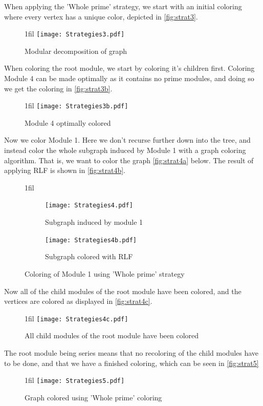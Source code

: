 \documentclass[a4paper]{article}
\makeatletter
\newcommand*{\centerfloat}{%
  \parindent \z@
  \leftskip \z@ \@plus 1fil \@minus \textwidth
  \rightskip\leftskip
  \parfillskip \z@skip}
\makeatother
\begin{document}
When applying the 'Whole prime' strategy, we start with an initial coloring 
where every vertex has a unique color, depicted in \autoref{fig:strat3}.

\begin{figure}[H]
    \centerfloat
    \texttt{[image: Strategies3.pdf]}
    \caption{Modular decomposition of graph}
    \label{fig:strat3}
\end{figure}

When coloring the root module, we start by coloring it's children first.
Coloring Module 4 can be made optimally as it contains no prime modules, and
doing so we get the coloring in \autoref{fig:strat3b}.

\begin{figure}[H]
    \centerfloat
    \texttt{[image: Strategies3b.pdf]}
    \caption{Module 4 optimally colored}
    \label{fig:strat3b}
\end{figure}

Now we color Module 1. Here we don't recurse further down into the tree, and
instead color the whole subgraph induced by Module 1 with a graph coloring
algorithm. That is, we want to color the graph \autoref{fig:strat4a} below.
The result of applying RLF is shown in \autoref{fig:strat4b}.

\begin{figure}[H]
\centerfloat
    \begin{subfigure}{.4\textwidth}
        \texttt{[image: Strategies4.pdf]}
      \caption{Subgraph induced by module 1}
      \label{fig:strat4a}
    \end{subfigure}%
    \begin{subfigure}{.4\textwidth}
        \texttt{[image: Strategies4b.pdf]}
      \caption{Subgraph colored with RLF}
      \label{fig:strat4b}
    \end{subfigure}
\caption{Coloring of Module 1 using 'Whole prime' strategy}
\label{fig:strat4}
\end{figure}

Now all of the child modules of the root module have been colored, and the vertices
are colored as displayed in \autoref{fig:strat4c}.

\begin{figure}[H]
    \centerfloat
    \texttt{[image: Strategies4c.pdf]}
    \caption{All child modules of the root module have been colored}
    \label{fig:strat4c}
\end{figure}

The root
module being series means that no recoloring of the child modules have to
be done, and that we have a finished coloring, which can be seen in
\autoref{fig:strat5}
\begin{figure}[H]
    \centerfloat
    \texttt{[image: Strategies5.pdf]}
    \caption{Graph colored using 'Whole prime' coloring}
    \label{fig:strat5}
\end{figure}
\FloatBarrier
\end{document}
